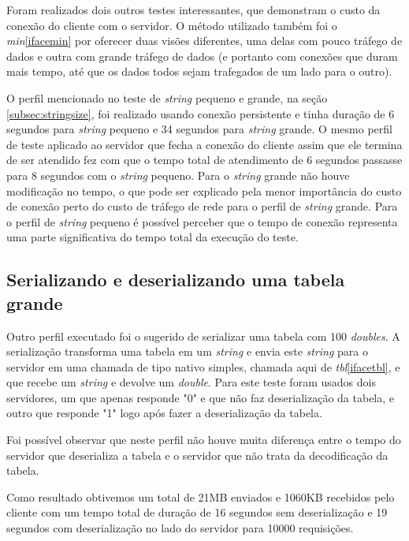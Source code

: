 \documentclass[11pt]{article}
\begin{document}
Foram realizados dois outros testes interessantes, que demonstram o custo da
conexão do cliente com o servidor. O método utilizado também foi o
\textit{min}\ref{ifacemin} por oferecer duas visões diferentes, uma delas com
pouco tráfego de dados e outra com grande tráfego de dados (e portanto com
conexões que duram mais tempo, até que os dados todos sejam trafegados de um
lado para o outro).

O perfil mencionado no teste de \textit{string} pequeno e grande, na seção
\ref{subsec:stringsize}, foi realizado usando conexão persistente e tinha
duração de 6 segundos para \textit{string} pequeno e 34 segundos para
\textit{string} grande. O mesmo perfil de teste aplicado ao servidor que fecha a
conexão do cliente assim que ele termina de ser atendido fez com que o tempo
total de atendimento de 6 segundos passasse para 8 segundos com o
\textit{string} pequeno. Para o \textit{string} grande não houve modificação no
tempo, o que pode ser explicado pela menor importância do custo de conexão perto
do custo de tráfego de rede para o perfil de \textit{string} grande. Para o
perfil de \textit{string} pequeno é possível perceber que o tempo de conexão
representa uma parte significativa do tempo total da execução do teste.

\subsection{Serializando e deserializando uma tabela grande}\label{subsec:serdeser}

Outro perfil executado foi o sugerido de serializar uma tabela com 100
\textit{doubles}. A serialização transforma uma tabela em um \textit{string} e
envia este \textit{string} para o servidor em uma chamada de tipo nativo
simples, chamada aqui de \textit{tbl}\ref{ifacetbl}, e que recebe um
\textit{string} e devolve um \textit{double}. Para este teste foram usados dois
servidores, um que apenas responde "0" e que não faz deserialização da tabela, e
outro que responde "1" logo após fazer a deserialização da tabela.

Foi possível observar que neste perfil não houve muita diferença entre o tempo
do servidor que deserializa a tabela e o servidor que não trata da decodificação
da tabela.

Como resultado obtivemos um total de 21MB enviados e 1060KB recebidos pelo
cliente com um tempo total de duração de 16 segundos sem deserialização e 19
segundos com deserialização no lado do servidor para 10000 requisições.
\end{document}
